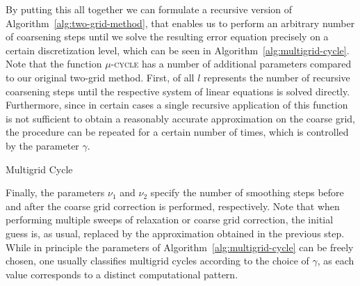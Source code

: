By putting this all together we can formulate a recursive version of Algorithm~\ref{alg:two-grid-method}, that enables us to perform an arbitrary number of coarsening steps until we solve the resulting error equation precisely on a certain discretization level, which can be seen in Algorithm~\ref{alg:multigrid-cycle}.
Note that the function \textsc{$\mu$-cycle} has a number of additional parameters compared to our original two-grid method.
First, of all $l$ represents the number of recursive coarsening steps until the respective system of linear equations is solved directly.
Furthermore, since in certain cases a single recursive application of this function is not sufficient to obtain a reasonably accurate approximation on the coarse grid, the procedure can be repeated for a certain number of times, which is controlled by the parameter $\gamma$.
\begin{algorithm}
	\caption{Multigrid Cycle}
	\label{alg:multigrid-cycle}
	\begin{algorithmic}
		\EndFor
		\Else
		\EndFor
		\EndIf
		\EndFor
		\State {}
		\EndFunction
	\end{algorithmic}
\end{algorithm}
Finally, the parameters $\nu_1$ and $\nu_2$ specify the number of smoothing steps before and after the coarse grid correction is performed, respectively.
Note that when performing multiple sweeps of relaxation or coarse grid correction, the initial guess is, as usual, replaced by the approximation obtained in the previous step.
While in principle the parameters of Algorithm~\ref{alg:multigrid-cycle} can be freely chosen, one usually classifies multigrid cycles according to the choice of $\gamma$, as each value corresponds to a distinct computational pattern.
